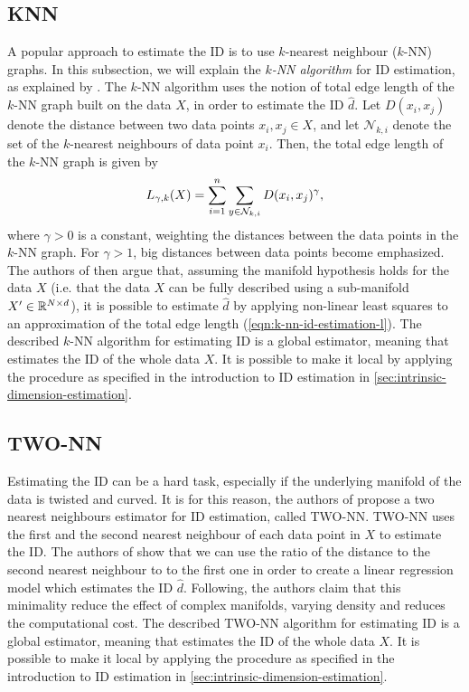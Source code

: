 \subsection{KNN}
\label{sec:id-estimation-knn}
A popular approach to estimate the ID is to use $k$-nearest neighbour ($k$-NN) graphs. In this subsection, we will explain the \textit{$k$-NN algorithm} for ID estimation, as explained by \cite[p. 651]{Carter2010}. The $k$-NN algorithm uses the notion of total edge length of the $k$-NN graph built on the data $X$, in order to estimate the ID $\hat{d}$. Let $D(x_i, x_j)$ denote the distance between two data points $x_i, x_j \in X$, and let $\mathcal{N}_{k, i}$ denote the set of the $k$-nearest neighbours of data point $x_i$. Then, the total edge length of the $k$-NN graph is given by
\begin{align}
    L_{\gamma, k}(X) = \sum\limits_{i=1}^{n} \sum\limits_{y \in \mathcal{N}_{k, i}}^{} D(x_i, x_j)^\gamma,
    \label{eqn:k-nn-id-estimation-l}
\end{align}
where $\gamma>0$ is a constant, weighting the distances between the data points in the $k$-NN graph. For $\gamma>1$, big distances between data points become emphasized. The authors of \cite[p. 651]{Carter2010} then argue that, assuming the manifold hypothesis holds for the data $X$ (i.e. that the data $X$ can be fully described using a sub-manifold $X' \in \mathbb{R}^{N \times d}$), it is possible to estimate $\hat{d}$ by applying non-linear least squares to an approximation of the total edge length (\cref{eqn:k-nn-id-estimation-l}). The described $k$-NN algorithm for estimating ID is a global estimator, meaning that estimates the ID of the whole data $X$. It is possible to make it local by applying the procedure as specified in the introduction to ID estimation in \cref{sec:intrinsic-dimension-estimation}. 

\subsection{TWO-NN}
\label{sec:id-estimation-twonn}
Estimating the ID can be a hard task, especially if the underlying manifold of the data is twisted and curved. It is for this reason, the authors of \cite{Facco2017twonn} propose a two nearest neighbours estimator for ID estimation, called TWO-NN. TWO-NN uses the first and the second nearest neighbour of each data point in $X$ to estimate the ID. The authors of \cite{Facco2017twonn} show that we can use the ratio of the distance to the second nearest neighbour to to the first one in order to create a linear regression model which estimates the ID $\hat{d}$. Following, the authors claim that this minimality reduce the effect of complex manifolds, varying density and reduces the computational cost. The described TWO-NN algorithm for estimating ID is a global estimator, meaning that estimates the ID of the whole data $X$. It is possible to make it local by applying the procedure as specified in the introduction to ID estimation in \cref{sec:intrinsic-dimension-estimation}. 

